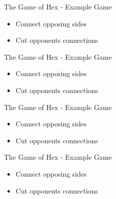 \documentclass{beamer}
\begin{document}
\begin{frame}{The Game of Hex - Example Game}
	\begin{figure}[tb]
	\end{figure}
	\begin{itemize}
		\item Connect opposing sides
		\item Cut opponents connections
	\end{itemize}
\end{frame}

\begin{frame}{The Game of Hex - Example Game}
	\begin{figure}[tb]
	\end{figure}
	\begin{itemize}
		\item Connect opposing sides
		\item Cut opponents connections
	\end{itemize}
\end{frame}

\begin{frame}{The Game of Hex - Example Game}
	\begin{figure}[tb]
	\end{figure}
	\begin{itemize}
		\item Connect opposing sides
		\item Cut opponents connections
	\end{itemize}
\end{frame}

\begin{frame}{The Game of Hex - Example Game}
	\begin{figure}[tb]
	\end{figure}
	\begin{itemize}
		\item Connect opposing sides
		\item Cut opponents connections
	\end{itemize}
\end{frame}
\end{document}
